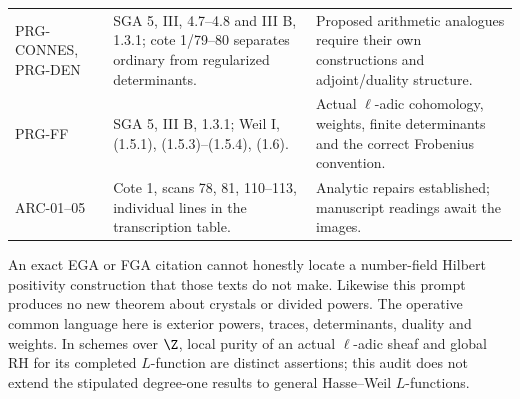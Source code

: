 \begin{longtable}{>{\raggedright\arraybackslash}p{}>{\raggedright\arraybackslash}p{}>{\raggedright\arraybackslash}p{}}
PRG-CONNES, PRG-DEN & SGA 5, III, 4.7--4.8 and III B, 1.3.1; cote 1/79--80 separates ordinary from regularized determinants. & Proposed arithmetic analogues require their own constructions and adjoint/duality structure.\\
PRG-FF & SGA 5, III B, 1.3.1; Weil I, (1.5.1), (1.5.3)--(1.5.4), (1.6). & Actual $\ell$-adic cohomology, weights, finite determinants and the correct Frobenius convention.\\
ARC-01--05 & Cote 1, scans 78, 81, 110--113, individual lines in the transcription table. & Analytic repairs established; manuscript readings await the images.\\\bottomrule
\end{longtable}
An exact EGA or FGA citation cannot honestly locate a number-field Hilbert positivity construction that those texts do not make. Likewise this prompt produces no new theorem about crystals or divided powers. The operative common language here is exterior powers, traces, determinants, duality and weights. In schemes over $\Z$, local purity of an actual $\ell$-adic sheaf and global RH for its completed $L$-function are distinct assertions; this audit does not extend the stipulated degree-one results to general Hasse--Weil $L$-functions.
